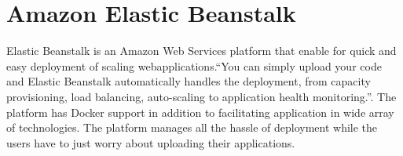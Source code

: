 \section{Amazon Elastic Beanstalk}
Elastic Beanstalk is an Amazon Web Services platform that enable for quick
and easy deployment of scaling webapplications.``You can simply upload your
code and Elastic Beanstalk automatically handles the deployment, from
capacity provisioning, load balancing, auto-scaling to application health
monitoring.''\cite{hid-sp18-411-amazonelasticbeanstalk}. The platform has
Docker support in addition to facilitating application in wide array of
technologies. The platform manages all the hassle of deployment while the
users have to just worry about uploading their applications.
